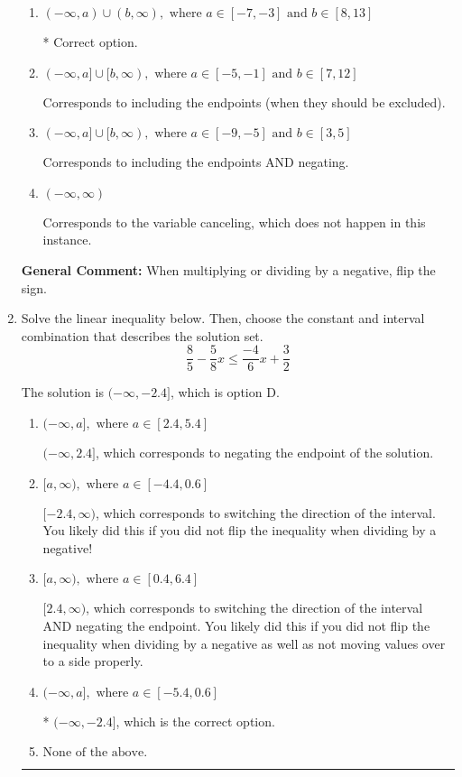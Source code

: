\documentclass{extbook}[14pt]
\newcommand{\litem}[1]{\item #1

\rule{\textwidth}{0.4pt}}
\begin{document}
\begin{enumerate}
{\begin{enumerate}[label=\Alph*.]
Corresponds to inverting the inequality and negating the solution.
\item \( (-\infty, a) \cup (b, \infty), \text{ where } a \in [-7, -3] \text{ and } b \in [8, 13] \)

 * Correct option.
\item \( (-\infty, a] \cup [b, \infty), \text{ where } a \in [-5, -1] \text{ and } b \in [7, 12] \)

Corresponds to including the endpoints (when they should be excluded).
\item \( (-\infty, a] \cup [b, \infty), \text{ where } a \in [-9, -5] \text{ and } b \in [3, 5] \)

Corresponds to including the endpoints AND negating.
\item \( (-\infty, \infty) \)

Corresponds to the variable canceling, which does not happen in this instance.
\end{enumerate}

\textbf{General Comment:} When multiplying or dividing by a negative, flip the sign.
}
\litem{
Solve the linear inequality below. Then, choose the constant and interval combination that describes the solution set.
\[ \frac{8}{5} - \frac{5}{8} x \leq \frac{-4}{6} x + \frac{3}{2} \]

The solution is \( (-\infty, -2.4] \), which is option D.\begin{enumerate}[label=\Alph*.]
\item \( (-\infty, a], \text{ where } a \in [2.4, 5.4] \)

 $(-\infty, 2.4]$, which corresponds to negating the endpoint of the solution.
\item \( [a, \infty), \text{ where } a \in [-4.4, 0.6] \)

 $[-2.4, \infty)$, which corresponds to switching the direction of the interval. You likely did this if you did not flip the inequality when dividing by a negative!
\item \( [a, \infty), \text{ where } a \in [0.4, 6.4] \)

 $[2.4, \infty)$, which corresponds to switching the direction of the interval AND negating the endpoint. You likely did this if you did not flip the inequality when dividing by a negative as well as not moving values over to a side properly.
\item \( (-\infty, a], \text{ where } a \in [-5.4, 0.6] \)

* $(-\infty, -2.4]$, which is the correct option.
\item \( \text{None of the above}. \)


\end{enumerate}}
\end{enumerate}
\end{document}
